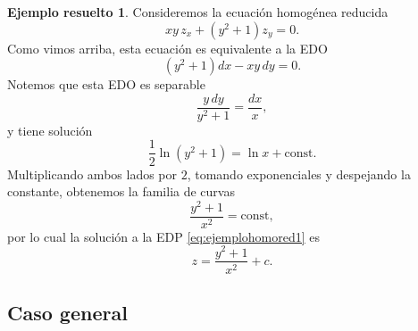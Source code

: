 \documentclass[11pt,letterpaper,draft]{report}
\theoremstyle{plain}
\theoremstyle{definition}
\newtheorem{solved}[theorem]{Ejemplo resuelto}
\theoremstyle{remark}
\newcommand\<{\langle}
\renewcommand\>{\rangle}
\newcommand\const{\mathrm{const}}
\begin{document}
\begin{solved}
  Consideremos la ecuación homogénea reducida
  \begin{equation}
    \label{eq:ejemplohomored1}
    xy \, z_x + (y^{2}+1)z_y = 0
  .\end{equation}
  Como vimos arriba, esta ecuación es equivalente a la EDO
  \begin{equation}
    (y^{2}+1)dx - xy \, dy = 0
  .\end{equation}
  Notemos que esta EDO es separable
  \begin{equation}
    \frac{y \, dy}{y^{2}+1} = \frac{dx}{x}
  ,\end{equation}
  y tiene solución
  \begin{equation}
    \frac{1}{2}\ln(y^{2}+1) = \ln x + \const
  .\end{equation}
  Multiplicando ambos lados por \(2\), tomando exponenciales y
  despejando la constante, obtenemos la familia de curvas
  \begin{equation}
    \frac{y^{2}+1}{x^{2}} = \const
  ,\end{equation}
  por lo cual la solución a la EDP \eqref{eq:ejemplohomored1} es
  \begin{equation}
    z = \frac{y^{2}+1}{x^{2}} + c
  .\end{equation}
\end{solved}

\subsection{Caso general}
\label{ssec:general-ord1}
\end{document}
